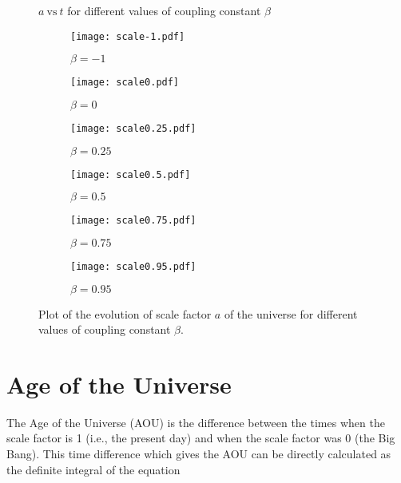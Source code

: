 \documentclass[preprint,aps,floatfix]{revtex4}
\begin{document}
    \begin{figure}[h]
        \centering
        $a~\text{vs}~ t$ for different values of coupling constant $\beta$ \vspace{10pt}\\
        \begin{subfigure}{0.5\textwidth}
            \centering
            \texttt{[image: scale-1.pdf]}
            \caption{$\beta = -1$}
        \end{subfigure}
        \begin{subfigure}{0.46\textwidth}
            \centering
            \texttt{[image: scale0.pdf]}
            \caption{$\beta = 0$}
        \end{subfigure}
        \begin{subfigure}{0.5\textwidth}
            \centering
            \texttt{[image: scale0.25.pdf]}
            \caption{$\beta = 0.25$}
        \end{subfigure}
        \begin{subfigure}{0.46\textwidth}
            \centering
            \texttt{[image: scale0.5.pdf]}
            \caption{$\beta = 0.5$}
        \end{subfigure}
        \begin{subfigure}{0.48\textwidth}
            \centering
            \texttt{[image: scale0.75.pdf]}
            \caption{$\beta = 0.75$}
        \end{subfigure}
        \begin{subfigure}{0.48\textwidth}
            \centering
            \texttt{[image: scale0.95.pdf]}
            \caption{$\beta = 0.95$}
        \end{subfigure}
        \caption{Plot of the evolution of scale factor $a$ of the universe for different values of coupling constant $\beta$.}
        \label{fig: scale}
    \end{figure}



    


    \section{Age of the Universe}
    \label{sec: aou}
\noindent 
    The Age of the Universe (AOU) is the difference between the times when the scale factor is 1 (i.e., the present day) and when the scale factor was 0 (the Big Bang). This time difference which gives the AOU can be directly calculated as the definite integral of the equation 
    
\end{document}
